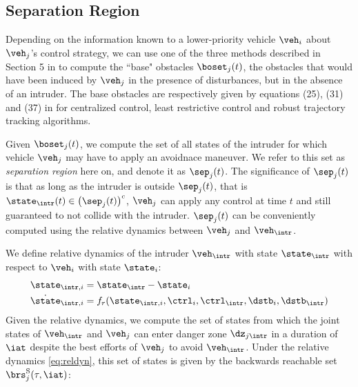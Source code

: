 \subsection{Separation Region} \label{sec:sepRegion}
Depending on the information known to a lower-priority vehicle $\veh_i$ about $\veh_j$'s control strategy, we can use one of the three methods described in Section 5 in \cite{chen2016robust} to compute the ``base" obstacles $\boset_j(t)$, the obstacles that would have been induced by $\veh_j$ in the presence of disturbances, but in the absence of an intruder. The base obstacles are respectively given by equations (25), (31) and (37) in \cite{chen2016robust} for centralized control, least restrictive control and robust trajectory tracking algorithms.

Given $\boset_j(t)$, we compute the set of all states of the intruder for which vehicle $\veh_j$ may have to apply an avoidnace maneuver. We refer to this set as \textit{separation region} here on, and denote it as $\sep_j(t)$. The significance of $\sep_j(t)$ is that as long as the intruder is outside $\sep_j(t)$, that is $\state_{\intr}(t) \in \left(\sep_j(t)\right)^c$, $\veh_j$ can apply any control at time $t$ and still guaranteed to not collide with the intruder. $\sep_j(t)$ can be conveniently computed using the relative dynamics between $\veh_j$ and $\veh_{\intr}$. 

We define relative dynamics of the intruder $\veh_{\intr}$ with state $\state_\intr$ with respect to $\veh_i$ with state $\state_i$:
\begin{equation}
\label{eq:reldyn}
\begin{aligned}
\state_{\intr, i} &= \state_\intr - \state_i \\
\dot \state_{\intr, i} &= f_r(\state_{\intr, i}, \ctrl_i, \ctrl_\intr, \dstb_i, \dstb_\intr)
\end{aligned}
\end{equation}
Given the relative dynamics, we compute the set of states from which the joint states of $\veh_{\intr}$ and $\veh_{j}$ can enter danger zone $\dz_{j\intr}$ in a duration of $\iat$ despite the best efforts of $\veh_j$ to avoid $\veh_{\intr}$. Under the relative dynamics \eqref{eq:reldyn}, this set of states is given by the backwards reachable set $\brs^{\text{S}}_j(\tau, \iat)$:

